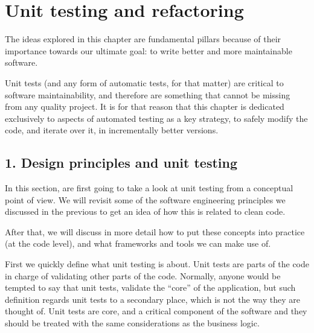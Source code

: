 \documentclass[a4paper,10pt,english]{sphinxmanual}
\begin{document}
\chapter{Unit testing and refactoring}
\label{\detokenize{chapters/8_unit_testing/index:unit-testing-and-refactoring}}\label{\detokenize{chapters/8_unit_testing/index::doc}}
The ideas explored in this chapter are fundamental pillars because of their importance towards our ultimate
goal: to write better and more maintainable software.

Unit tests (and any form of automatic tests, for that matter) are critical to software
maintainability, and therefore are something that cannot be missing from any quality
project. It is for that reason that this chapter is dedicated exclusively to aspects of
automated testing as a key strategy, to safely modify the code, and iterate over it, in
incrementally better versions.


\section{1. Design principles and unit testing}
\label{\detokenize{chapters/8_unit_testing/index:design-principles-and-unit-testing}}
In this section, are first going to take a look at unit testing from a conceptual point of view.
We will revisit some of the software engineering principles we discussed in the previous to
get an idea of how this is related to clean code.

After that, we will discuss in more detail how to put these concepts into practice (at the
code level), and what frameworks and tools we can make use of.

First we quickly define what unit testing is about. Unit tests are parts of the code in charge
of validating other parts of the code. Normally, anyone would be tempted to say that unit
tests, validate the “core” of the application, but such definition regards unit tests to a
secondary place, which is not the way they are thought of. Unit tests are core,
and a critical component of the software and they should be treated with the same
considerations as the business logic.
\end{document}
